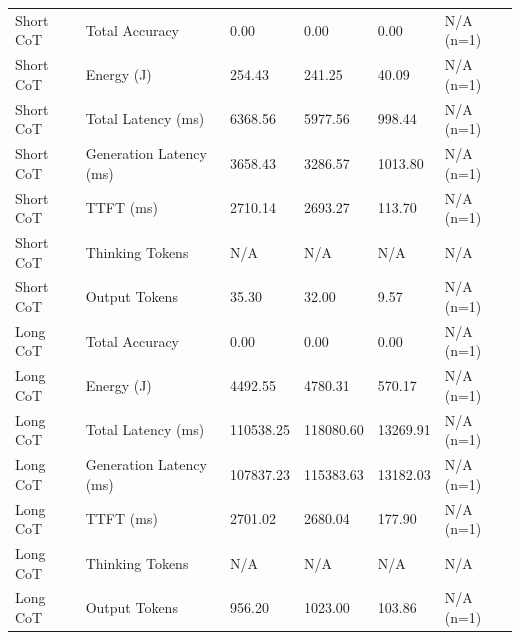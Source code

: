 \begin{table}
\begin{tabular}{llllll}
Short CoT & Total Accuracy & 0.00 & 0.00 & 0.00 & N/A (n=1) \\
Short CoT & Energy (J) & 254.43 & 241.25 & 40.09 & N/A (n=1) \\
Short CoT & Total Latency (ms) & 6368.56 & 5977.56 & 998.44 & N/A (n=1) \\
Short CoT & Generation Latency (ms) & 3658.43 & 3286.57 & 1013.80 & N/A (n=1) \\
Short CoT & TTFT (ms) & 2710.14 & 2693.27 & 113.70 & N/A (n=1) \\
Short CoT & Thinking Tokens & N/A & N/A & N/A & N/A \\
Short CoT & Output Tokens & 35.30 & 32.00 & 9.57 & N/A (n=1) \\
Long CoT & Total Accuracy & 0.00 & 0.00 & 0.00 & N/A (n=1) \\
Long CoT & Energy (J) & 4492.55 & 4780.31 & 570.17 & N/A (n=1) \\
Long CoT & Total Latency (ms) & 110538.25 & 118080.60 & 13269.91 & N/A (n=1) \\
Long CoT & Generation Latency (ms) & 107837.23 & 115383.63 & 13182.03 & N/A (n=1) \\
Long CoT & TTFT (ms) & 2701.02 & 2680.04 & 177.90 & N/A (n=1) \\
Long CoT & Thinking Tokens & N/A & N/A & N/A & N/A \\
Long CoT & Output Tokens & 956.20 & 1023.00 & 103.86 & N/A (n=1) \\
\bottomrule
\end{tabular}
\end{table}
